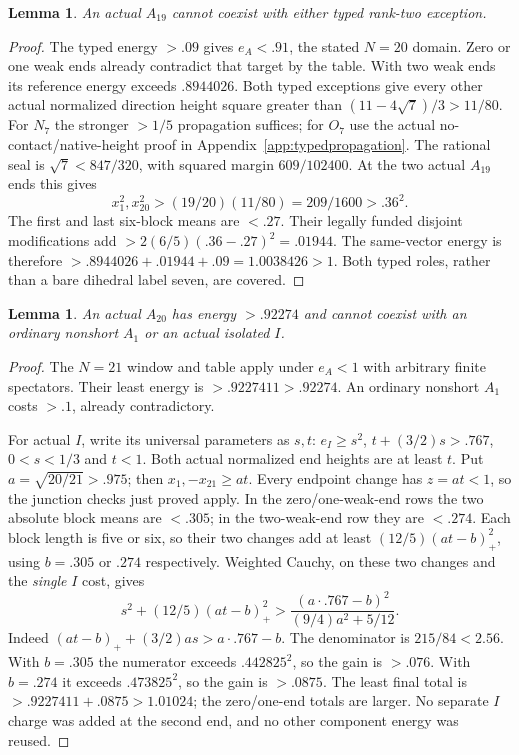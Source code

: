 \documentclass[11pt]{article}
\newtheorem{lemma}[theorem]{Lemma}
\theoremstyle{definition}
\theoremstyle{remark}
\begin{document}
\begin{lemma}
\label{app:tail:lem:A19typed}
An actual $A_{19}$ cannot coexist with either typed rank-two exception.
\end{lemma}
\begin{proof}
The typed energy $>.09$ gives $e_A<.91$, the stated $N=20$ domain.
Zero or one weak ends already contradict that target by the table.
With two weak ends its reference energy exceeds $.8944026$.
Both typed exceptions give every other actual normalized direction
height square greater than $(11-4\sqrt7)/3>11/80$.
For $N_7$ the stronger $>1/5$ propagation suffices; for $O_7$ use
the actual no-contact/native-height proof in
Appendix~\ref{app:typedpropagation}. The rational seal is
$\sqrt7<847/320$, with squared margin $609/102400$.
At the two actual $A_{19}$ ends this gives
\[
 x_1^2,x_{20}^2>(19/20)(11/80)=209/1600>.36^2.
\]
The first and last six-block means are $<.27$. Their legally
funded disjoint modifications add $>2(6/5)(.36-.27)^2=.01944$.
The same-vector energy is therefore
$>.8944026+.01944+.09=1.0038426>1$.
Both typed roles, rather than a bare dihedral label seven, are covered.
\end{proof}

\begin{lemma}
\label{app:tail:lem:A20A1}
An actual $A_{20}$ has energy $>.92274$ and cannot coexist with
an ordinary nonshort $A_1$ or an actual isolated $I$.
\end{lemma}
\begin{proof}
The $N=21$ window and table apply under $e_A<1$ with arbitrary
finite spectators. Their least energy is $>.9227411>.92274$.
An ordinary nonshort $A_1$ costs $>.1$, already contradictory.

For actual $I$, write its universal parameters as $s,t$:
$e_I\ge s^2$, $t+(3/2)s>.767$, $0<s<1/3$ and $t<1$.
Both actual normalized end heights are at least $t$. Put
$a=\sqrt{20/21}>.975$; then $x_1,-x_{21}\ge at$.
Every endpoint change has $z=at<1$, so the junction checks just
proved apply. In the zero/one-weak-end rows the two absolute block
means are $<.305$; in the two-weak-end row they are $<.274$.
Each block length is five or six, so their two changes add at least
$(12/5)(at-b)_+^2$, using $b=.305$ or $.274$ respectively.
Weighted Cauchy, on these two changes and the \emph{single} $I$ cost,
gives
\[
 s^2+(12/5)(at-b)_+^2>
 {\frac{(a\cdot.767-b)^2}{(9/4)a^2+5/12}}.
\]
Indeed $(at-b)_++(3/2)as>a\cdot.767-b$.
The denominator is $215/84<2.56$. With $b=.305$ the numerator
exceeds $.442825^2$, so the gain is $>.076$.
With $b=.274$ it exceeds $.473825^2$, so the gain is $>.0875$.
The least final total is $>.9227411+.0875>1.01024$;
the zero/one-end totals are larger. No separate $I$ charge was
added at the second end, and no other component energy was reused.
\end{proof}
\end{document}
